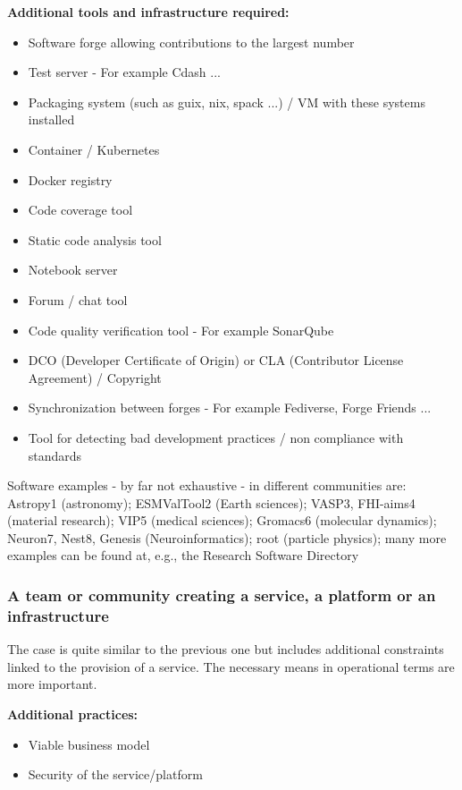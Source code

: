 {\bf Additional tools and infrastructure required:}
\begin{itemize}
\item Software forge allowing contributions to the largest number
\item Test server - For example Cdash ...
\item Packaging system (such as guix, nix, spack ...) / VM with these systems installed
\item Container / Kubernetes
\item Docker registry
\item Code coverage tool
\item Static code analysis tool
\item Notebook server
\item Forum / chat tool
\item Code quality verification tool - For example SonarQube
\item DCO (Developer Certificate of Origin) or CLA (Contributor License Agreement) / Copyright
\item Synchronization between forges - For example Fediverse, Forge Friends ...
\item Tool for detecting bad development practices / non compliance with
standards
\end{itemize}

Software examples - by far not exhaustive - in different communities
are: Astropy1 (astronomy);  ESMValTool2 (Earth sciences); VASP3,
FHI-aims4 (material research); VIP5 (medical sciences); Gromacs6
(molecular dynamics); Neuron7, Nest8, Genesis (Neuroinformatics); root
(particle physics); many more examples can be found at, e.g., the
Research Software Directory


\subsubsection{A team or community creating a service, a platform or an infrastructure}

The case is quite similar to the previous one but includes additional
constraints linked to the provision of a service. The necessary means
in operational terms are more important. 

{\bf Additional practices:}
\begin{itemize}
\item Viable business model
\item Security of the service/platform
\end{itemize}

